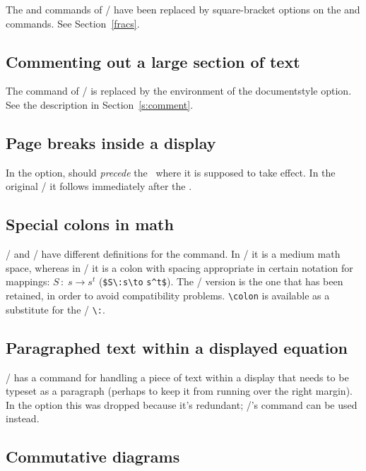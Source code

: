 The  and  commands of
\amstex/ have been replaced by square-bracket options on
the  and  commands.  See
Section~\ref{fracs}.

\subsection{Commenting out a  large section of text}

The  command of \amstex/ is replaced by the
 environment of the  documentstyle
option.  See the description in Section~\ref{s:comment}.

\subsection{Page breaks inside a display}

In the  option,  should
{\em precede\/} the \cs\bslash\ where it is supposed to take effect.
In the original \amstex/ it follows
immediately after the \cs\bslash.

\subsection{Special colons in math}
\latex/ and \amstex/ have different definitions for the \cs{:} command.
In \latex/ it is a medium math space, whereas in \amstex/ it is a colon
with spacing appropriate in certain notation for mappings:
$S\,{:}\;s\to s^t$ (\verb"$S\:s\to" \5\verb"s^t$"). The \latex/ version
is the one that has been retained, in order to avoid compatibility
problems.  \verb"\colon" is available as a substitute for the \amstex/
\verb"\:".

\subsection{Paragraphed text within a displayed equation}

\amstex/ has a  command  for handling
a piece of text within a display that needs to be typeset
as a paragraph (perhaps to keep it from running over the right
margin).  In the  option this was dropped because
it's redundant; \latex/'s  command
can be used instead.

\subsection{Commutative diagrams}

